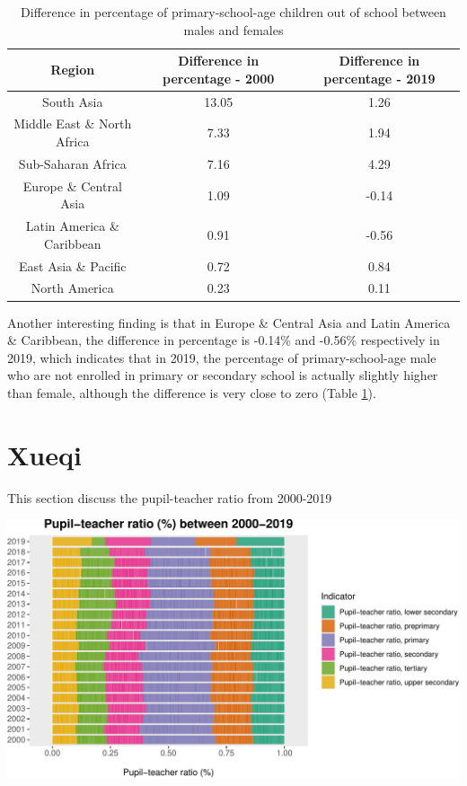 \documentclass[11pt,a4paper,]{article}
\begin{document}
\begin{table}[H]

\caption{\label{tab:tb1xw}Difference in percentage of primary-school-age children out of school between males and females}
\centering
\begin{tabular}[t]{c|c|c}
\hline
Region & Difference in percentage - 2000 & Difference in percentage - 2019\\
\hline
South Asia & 13.05 & 1.26\\
\hline
Middle East \& North Africa & 7.33 & 1.94\\
\hline
Sub-Saharan Africa & 7.16 & 4.29\\
\hline
Europe \& Central Asia & 1.09 & -0.14\\
\hline
Latin America \& Caribbean & 0.91 & -0.56\\
\hline
East Asia \& Pacific & 0.72 & 0.84\\
\hline
North America & 0.23 & 0.11\\
\hline
\end{tabular}
\end{table}

Another interesting finding is that in Europe \& Central Asia and Latin America \& Caribbean, the difference in percentage is -0.14\% and -0.56\% respectively in 2019, which indicates that in 2019, the percentage of primary-school-age male who are not enrolled in primary or secondary school is actually slightly higher than female, although the difference is very close to zero (Table \ref{tab:tb1xw}).

\section*{Xueqi}

This section discuss the pupil-teacher ratio from 2000-2019

\includegraphics{report_files/figure-latex/figure1-1}
\end{document}
